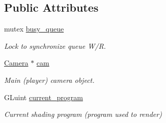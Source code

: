 \subsection*{Public Attributes}
\begin{DoxyCompactItemize}
\item 
mutex \mbox{\hyperlink{classRenderer_a044abbf0e0cbe0446bec0d0f00b2d060}{busy\+\_\+queue}}
\begin{DoxyCompactList}\small\item\em Lock to synchronize queue W/R. \end{DoxyCompactList}\item 
\mbox{\hyperlink{classCamera}{Camera}} $\ast$ \mbox{\hyperlink{classRenderer_a83cc09617ebb267932620bce0a69c540}{cam}}
\begin{DoxyCompactList}\small\item\em Main (player) camera object. \end{DoxyCompactList}\item 
G\+Luint \mbox{\hyperlink{classRenderer_a1012d49fe5c011d92d8997c448b2e7ea}{current\+\_\+program}}
\begin{DoxyCompactList}\small\item\em Current shading program (program used to render) \end{DoxyCompactList}\end{DoxyCompactItemize}
